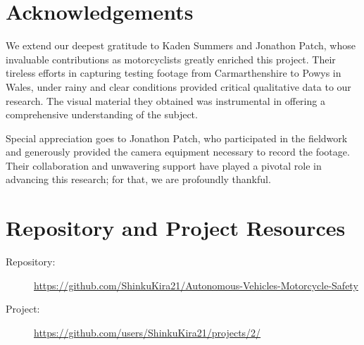 \documentclass[12pt]{report} %
\begin{document}
\chapter*{Acknowledgements}

\setcounter{page}{5}
We extend our deepest gratitude to Kaden Summers and Jonathon Patch, whose invaluable contributions as motorcyclists greatly enriched this project. Their tireless efforts in capturing testing footage from Carmarthenshire to Powys in Wales, under rainy and clear conditions provided critical qualitative data to our research. The visual material they obtained was instrumental in offering a comprehensive understanding of the subject.
	
Special appreciation goes to Jonathon Patch, who participated in the fieldwork and generously provided the camera equipment necessary to record the footage. Their collaboration and unwavering support have played a pivotal role in advancing this research; for that, we are profoundly thankful.	
\vfill

\newpage %
\thispagestyle{empty}
\mbox{}

\chapter*{Repository and Project Resources}
\setcounter{page}{6}
	\begin{description}
		\item[Repository:] \href{https://github.com/ShinkuKira21/Autonomous-Vehicles-Motorcycle-Safety}{https://github.com/ShinkuKira21/Autonomous-Vehicles-Motorcycle-Safety}
		\item[Project:] \href{https://github.com/users/ShinkuKira21/projects/2/}{https://github.com/users/ShinkuKira21/projects/2/}
  	\end{description}
\vfill

\newpage %
\thispagestyle{empty}
\mbox{}


\tableofcontents
\thispagestyle{fancy}

\newpage %
\thispagestyle{empty}
\mbox{}

\listoffigures
\thispagestyle{fancy}

\newpage %
\thispagestyle{empty}
\mbox{}

\listoftables
\thispagestyle{fancy}
\end{document}
